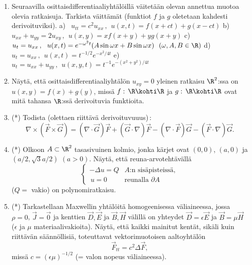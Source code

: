 \begin{enumerate}
\item
Seuraavilla osittaisdifferentiaaliyhtälöillä väitetään olevan annettua muotoa olevia ratkaisuja.
Tarkista väittämät (funktiot $f$ ja $g$ oletetaan kahdesti derivoituviksi).
\vspace{1mm}\newline
a) \ $u_{tt}=c^2u_{xx}\,,\ \ u(x,t)=f(x+ct)+g(x-ct)$ \vspace{1mm}\newline
b) \ $u_{xx}+u_{yy}=2u_{xy}\,,\ \ u(x,y)=xf(x+y)+yg(x+y)$ \vspace{1mm}\newline
c) \ $u_t=u_{xx}\,,\ \ u(x,t)=e^{-\omega^2 t}(A\sin\omega x+B\sin\omega x)\ \ (\omega,A,B\in\R)$
\vspace{1mm}\newline
d) \ $u_t=u_{xx}\,,\ \ u(x,t)=t^{-1/2}e^{-x^2/4t}$ \vspace{1mm}\newline
e) \ $u_t=u_{xx}+u_{yy}\,,\ \ u(x,y,t)=t^{-1}e^{-(x^2+y^2)/4t}$

\item
Näytä, että osittaisdifferentiaaliyhtälön $u_{xy}=0$ yleinen ratkaisu $\R^2$:ssa on
$u(x,y)=f(x)+g(y)$, missä $f:\,\R\kohti\R$ ja $g:\,\R\kohti\R$ ovat mitä tahansa $\R$:ssä 
derivoituvia funktioita.

\item (*)
Todista (olettaen riittävä derivoituvuuus)\,:
\[
\nabla\times(\vec F\times\vec G)=(\nabla\cdot\vec G)\vec F+(\vec G\cdot\nabla)\vec F
                                -(\nabla\cdot\vec F)\vec G-(\vec F\cdot\nabla)\vec G.
\]

\item (*)
Olkoon $A\subset\R^2$ tasasivuinen kolmio, jonka kärjet ovat $(0,0)$, $(a,0)$ ja
$(a/2,\sqrt{3}a/2)$ $(a>0)$. Näytä, että reuna-arvotehtävällä
\[
\begin{cases} 
-\Delta u=Q &\text{$A$:n sisäpisteissä}, \\ \,u=0 &\text{reunalla $\partial A$}
\end{cases}
\]
($Q=$ vakio) on polynomiratkaisu.

\item (*)
Tarkastellaan Maxwellin yhtälöitä homogeenisessa väliaineessa, jossa $\rho=0$, $\vec J=\vec 0$
ja kenttien $\vec D,\vec E$ ja $\vec B,\vec H$ välillä on yhteydet $\vec D=\epsilon\vec E$ ja 
$\vec B=\mu\vec H$ ($\epsilon$ ja $\mu$ materiaalivakioita). Näytä, että kaikki mainitut
kentät, sikäli kuin riittävän säännöllisiä, toteuttavat vektorimuotoisen aaltoyhtälön
\[
\vec F_{tt}=c^2\Delta\vec F,
\]
missä $c=(\epsilon\mu)^{-1/2}$ (= valon nopeus väliaineessa). 

\end{enumerate}